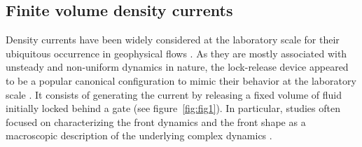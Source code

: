 \documentclass[12pt]{article}
\begin{document}
\subsection{Finite volume density currents}
\label{sec:intro_lockrelease}

Density currents have been widely considered at the laboratory scale for their ubiquitous occurrence in geophysical flows \citep{Hopfinger1983,Simpson1999,Dufek2016}. As they are mostly associated with unsteady and non-uniform dynamics in nature, the lock-release device appeared to be a popular canonical configuration to mimic their behavior at the laboratory scale \citep{Hacker1996,Shin2004,Nogueira2014}. It consists of generating the current by releasing a fixed volume of fluid initially locked behind a gate (see figure~\ref{fig:fig1}). In particular, studies often focused on characterizing the front dynamics and the front shape as a macroscopic description of the underlying complex dynamics \citep{Rottman1983,Marino2005,Hogg2006}.
\end{document}
